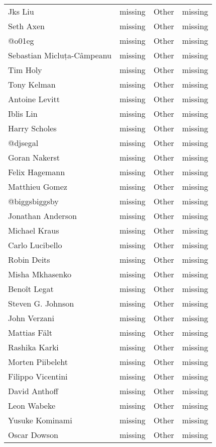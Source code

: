 \begin{longtable}{p{4cm}p{4cm}ll}
  Jks Liu & missing & Other & missing \\
  Seth Axen & missing & Other & missing \\
  @o01eg & missing & Other & missing \\
  Sebastian Micluța-Câmpeanu & missing & Other & missing \\
  Tim Holy & missing & Other & missing \\
  Tony Kelman & missing & Other & missing \\
  Antoine Levitt & missing & Other & missing \\
  Iblis Lin & missing & Other & missing \\
  Harry Scholes & missing & Other & missing \\
  @djsegal & missing & Other & missing \\
  Goran Nakerst & missing & Other & missing \\
  Felix Hagemann & missing & Other & missing \\
  Matthieu Gomez & missing & Other & missing \\
  @biggsbiggsby & missing & Other & missing \\
  Jonathan Anderson & missing & Other & missing \\
  Michael Kraus & missing & Other & missing \\
  Carlo Lucibello & missing & Other & missing \\
  Robin Deits & missing & Other & missing \\
  Misha Mkhasenko & missing & Other & missing \\
  Benoît Legat & missing & Other & missing \\
  Steven G. Johnson & missing & Other & missing \\
  John Verzani & missing & Other & missing \\
  Mattias Fält & missing & Other & missing \\
  Rashika Karki & missing & Other & missing \\
  Morten Piibeleht & missing & Other & missing \\
  Filippo Vicentini & missing & Other & missing \\
  David Anthoff & missing & Other & missing \\
  Leon Wabeke & missing & Other & missing \\
  Yusuke Kominami & missing & Other & missing \\
  Oscar Dowson & missing & Other & missing \\

\end{longtable}
